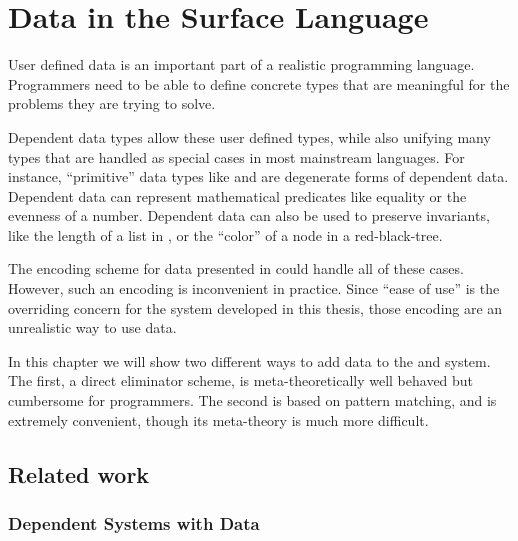 \chapter{Data in the Surface Language}
\label{chapter:SurfaceData}
\thispagestyle{myheadings}


User defined data is an important part of a realistic programming language.
Programmers need to be able to define concrete types that are meaningful for the problems they are trying to solve.

Dependent data types allow these user defined types, while also unifying many types that are handled as special cases in most mainstream languages.
For instance, ``primitive'' data types like \Nat{} and \Bool{} are degenerate forms of dependent data.
Dependent data can represent mathematical predicates like equality or the evenness of a number.
Dependent data can also be used to preserve invariants, like the length of a list in \Vect{}, or the ``color'' of a node in a red-black-tree.

The encoding scheme for data presented in  could handle all of these cases.
However, such an encoding is inconvenient in practice.
Since ``ease of use'' is the overriding concern for the system developed in this thesis, those encoding are an unrealistic way to use data.

In this chapter we will show two different ways to add data to the \slang{} and \bidir{} system.
The first, a direct eliminator scheme, is meta-theoretically well behaved but cumbersome for programmers.
The second is based on pattern matching, and is extremely convenient, though its meta-theory is much more difficult.




% 

\section{Related work}

\subsection{Dependent Systems with Data}

